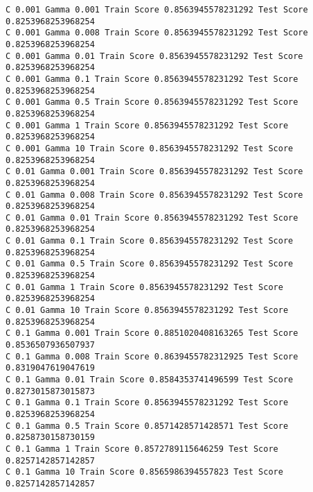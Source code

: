 \documentclass[11pt]{article}
\begin{document}
    \begin{Verbatim}[commandchars=\\\{\}]
C 0.001 Gamma 0.001 Train Score 0.8563945578231292 Test Score 0.8253968253968254
C 0.001 Gamma 0.008 Train Score 0.8563945578231292 Test Score 0.8253968253968254
C 0.001 Gamma 0.01 Train Score 0.8563945578231292 Test Score 0.8253968253968254
C 0.001 Gamma 0.1 Train Score 0.8563945578231292 Test Score 0.8253968253968254
C 0.001 Gamma 0.5 Train Score 0.8563945578231292 Test Score 0.8253968253968254
C 0.001 Gamma 1 Train Score 0.8563945578231292 Test Score 0.8253968253968254
C 0.001 Gamma 10 Train Score 0.8563945578231292 Test Score 0.8253968253968254
C 0.01 Gamma 0.001 Train Score 0.8563945578231292 Test Score 0.8253968253968254
C 0.01 Gamma 0.008 Train Score 0.8563945578231292 Test Score 0.8253968253968254
C 0.01 Gamma 0.01 Train Score 0.8563945578231292 Test Score 0.8253968253968254
C 0.01 Gamma 0.1 Train Score 0.8563945578231292 Test Score 0.8253968253968254
C 0.01 Gamma 0.5 Train Score 0.8563945578231292 Test Score 0.8253968253968254
C 0.01 Gamma 1 Train Score 0.8563945578231292 Test Score 0.8253968253968254
C 0.01 Gamma 10 Train Score 0.8563945578231292 Test Score 0.8253968253968254
C 0.1 Gamma 0.001 Train Score 0.8851020408163265 Test Score 0.8536507936507937
C 0.1 Gamma 0.008 Train Score 0.8639455782312925 Test Score 0.8319047619047619
C 0.1 Gamma 0.01 Train Score 0.8584353741496599 Test Score 0.8273015873015873
C 0.1 Gamma 0.1 Train Score 0.8563945578231292 Test Score 0.8253968253968254
C 0.1 Gamma 0.5 Train Score 0.8571428571428571 Test Score 0.8258730158730159
C 0.1 Gamma 1 Train Score 0.8572789115646259 Test Score 0.8257142857142857
C 0.1 Gamma 10 Train Score 0.8565986394557823 Test Score 0.8257142857142857


    \end{Verbatim}
\end{document}
